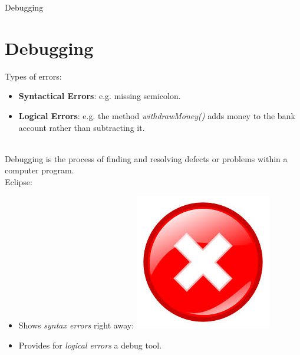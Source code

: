 \documentclass[11pt]{beamer}
\begin{document}
	\begin{frame}{Debugging}
		\section{Debugging}
				
		Types of errors:
		\begin{itemize}
			\item{\textbf{Syntactical Errors}: e.g. missing semicolon.}
			\item{\textbf{Logical Errors}: e.g. the method \textit{withdrawMoney()} adds money to the bank account rather than subtracting it.}	
		\end{itemize}
		~\\
		Debugging is the process of finding and resolving defects or problems within a computer program.\\
		
		Eclipse:
		\begin{itemize}
			\item{Shows \textit{syntax errors} right away: \includegraphics[scale=0.05]{images/eclipse_error_symbol.jpeg}}
			\item{Provides for \textit{logical errors} a debug tool.}
		\end{itemize}		 
	\end{frame}
	
\end{document}
